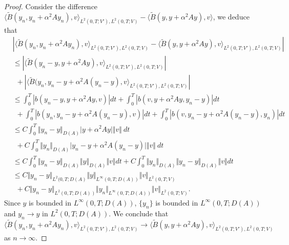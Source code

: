 \documentclass[reqno]{amsart}
\begin{document}
	\begin{proof}
		Consider the difference $\langle \widetilde{B}(y_n, y_n+\alpha^2 Ay_n),v \rangle _{L^2(0,T;V'),L^2(0,T;V)} - \langle \widetilde{B}(y,y+\alpha^2Ay),v \rangle $, we deduce that
		\begin{align*}
			&\left| \langle \widetilde{B}(y_n, y_n+\alpha^2 Ay_n),v \rangle _{L^2(0,T;V'),L^2(0,T;V)} - \langle \widetilde{B}(y,y+\alpha^2 Ay),v \rangle_{L^2(0,T;V'),L^2(0,T;V)}  \right|\\
			&\leq \left| \langle \widetilde{B}(y_n-y,y+\alpha^2Ay), v \rangle_{L^2(0,T;V'),L^2(0,T;V)}  \right| \\
			&\hspace{5pt}+ \left| \langle \widetilde{B}(y_n, y_n- y +\alpha^2 A(y_n-y),v \rangle_{L^2(0,T;V'),L^2(0,T;V)}  \right|\\
			&\leq \int_0^T \left| b(y_n-y, y+\alpha^2Ay, v) \right| dt + \int_0^T \left| b(v, y+\alpha^2Ay, y_n-y) \right| dt \\
			&\hspace{5pt}+\int_0^T \left| b(y_n, y_n-y+\alpha^2 A(y_n-y),v) \right| dt + \int_0^T \left| b(v, y_n-y+\alpha^2 A(y_n-y),y_n) \right| dt \\
			&\leq C \int_0^T \Vert y_n - y \Vert_{D(A)} \vert y+\alpha^2Ay \vert \Vert v \Vert \ dt \\
			&\hspace{5pt}+ C \int_0^T \Vert y_n \Vert_{D(A)} \vert y_n - y+ \alpha^2 A(y_n - y) \vert \Vert v \Vert \ dt \\
			&\leq C \int_0^T \Vert y_n - y \Vert_{D(A)} \Vert y \Vert_{D(A)} \Vert v \Vert dt + C \int_0^T \Vert y_n \Vert_{D(A)} \Vert y_n - y \Vert_{D(A)} \Vert v \Vert dt \\
			&\leq C \Vert y_n - y \Vert_{L^2(0,T;D(A)} \Vert y \Vert_{L^\infty(0,T;D(A))} \Vert v \Vert_{L^2(0,T;V)} \\
			&\hspace{5pt}+ C \Vert y_n - y \Vert_{L^2(0,T;D(A))}  \Vert y_n \Vert_{L^\infty(0,T;D(A))} \Vert v \Vert_{L^2(0,T;V)}.   
		\end{align*}
		Since $y$ is bounded in $L^\infty(0,T;D(A))$, $\{y_n\}$ is bounded in $L^\infty(0,T;D(A))$ and $y_n \rightarrow y $ in $L^2(0,T;D(A))$. We conclude that \[ \langle \widetilde{B}(y_n, y_n+\alpha^2 Ay_n),v \rangle _{L^2(0,T;V'),L^2(0,T;V)} \rightarrow \langle \widetilde{B}(y,y+\alpha^2Ay),v \rangle _{L^2(0,T;V'),L^2(0,T;V)} \] as $n \rightarrow \infty$.
	\end{proof}
	
\end{document}
